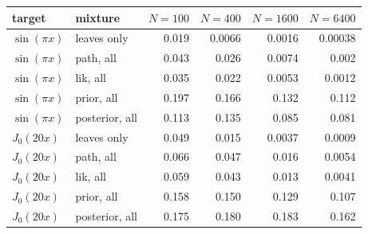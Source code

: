 \begin{tabular}{@{}llrrrr@{}}\toprule
target & mixture & $N=100$ & $N=400$ & $N=1600$ & $N=6400$\\\midrule
$\sin(\pi x)$ & leaves only & 0.019 & 0.0066 & 0.0016 & 0.00038\\
$\sin(\pi x)$ & path, all & 0.043 & 0.026 & 0.0074 & 0.002\\
$\sin(\pi x)$ & lik, all & 0.035 & 0.022 & 0.0053 & 0.0012\\
$\sin(\pi x)$ & prior, all & 0.197 & 0.166 & 0.132 & 0.112\\
$\sin(\pi x)$ & posterior, all & 0.113 & 0.135 & 0.085 & 0.081\\
$J_0(20x)$ & leaves only & 0.049 & 0.015 & 0.0037 & 0.0009\\
$J_0(20x)$ & path, all & 0.066 & 0.047 & 0.016 & 0.0054\\
$J_0(20x)$ & lik, all & 0.059 & 0.043 & 0.013 & 0.0041\\
$J_0(20x)$ & prior, all & 0.158 & 0.150 & 0.129 & 0.107\\
$J_0(20x)$ & posterior, all & 0.175 & 0.180 & 0.183 & 0.162\\
\bottomrule\end{tabular}